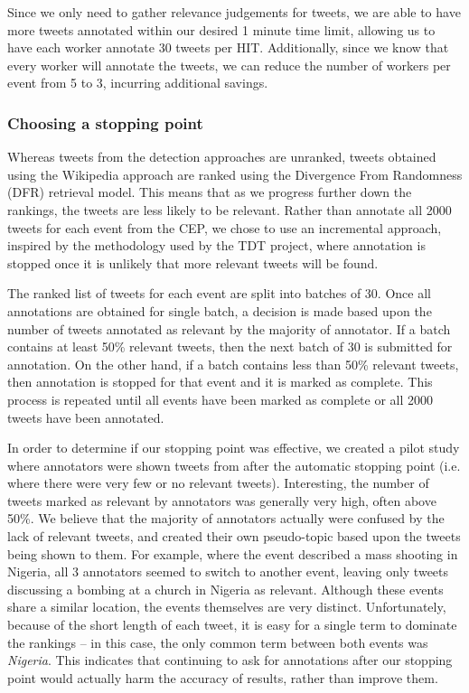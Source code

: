 Since we only need to gather relevance judgements for tweets, we are able to have more tweets annotated within our desired 1 minute time limit, allowing us to have each worker annotate 30 tweets per HIT.
Additionally, since we know that every worker will annotate the tweets, we can reduce the number of workers per event from 5 to 3, incurring additional savings.

\subsubsection{Choosing a stopping point}
Whereas tweets from the detection approaches are unranked, tweets obtained using the Wikipedia approach are ranked using the Divergence From Randomness (DFR) \citep{Amati02} retrieval model.
This means that as we progress further down the rankings, the tweets are less likely to be relevant.
Rather than annotate all 2000 tweets for each event from the CEP, we chose to use an incremental approach, inspired by the methodology used by the TDT project, where annotation is stopped once it is unlikely that more relevant tweets will be found.

The ranked list of tweets for each event are split into batches of 30.
Once all annotations are obtained for single batch, a decision is made based upon the number of tweets annotated as relevant by the majority of annotator.
If a batch contains at least 50\% relevant tweets, then the next batch of 30 is submitted for annotation.
On the other hand, if a batch contains less than 50\% relevant tweets, then annotation is stopped for that event and it is marked as complete.
This process is repeated until all events have been marked as complete or all 2000 tweets have been annotated.

In order to determine if our stopping point was effective, we created a pilot study where annotators were shown tweets from after the automatic stopping point (i.e. where there were very few or no relevant tweets).
Interesting, the number of tweets marked as relevant by annotators was generally very high, often above 50\%.
We believe that the majority of annotators actually were confused by the lack of relevant tweets, and created their own pseudo-topic based upon the tweets being shown to them.
For example, where the event described a mass shooting in Nigeria, all 3 annotators seemed to switch to another event, leaving only tweets discussing a bombing at a church in Nigeria as relevant.
Although these events share a similar location, the events themselves are very distinct.
Unfortunately, because of the short length of each tweet, it is easy for a single term to dominate the rankings -- in this case, the only common term between both events was \emph{Nigeria}.
This indicates that continuing to ask for annotations after our stopping point would actually harm the accuracy of results, rather than improve them.

